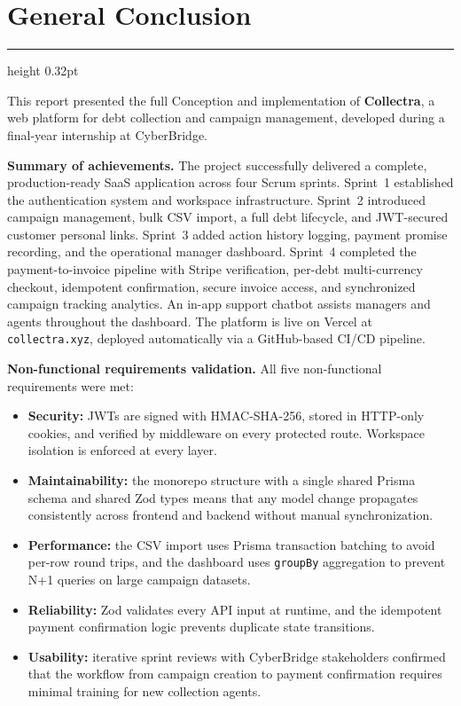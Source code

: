 \documentclass[12pt,a4paper]{report}
\newcommand{\sectionrule}{%
  \vspace{-1pt}%
  {\color{accentblue!22}\hrule height 0.32pt}%
  \vspace{5pt}%
}
\begin{document}
\chapter*{General Conclusion}
{}
\sectionrule

This report presented the full Conception and implementation of \textbf{Collectra}, a
web platform for debt collection and campaign management, developed during a
final-year internship at CyberBridge.

\textbf{Summary of achievements.}
The project successfully delivered a complete, production-ready SaaS application
across four Scrum sprints.
Sprint~1 established the authentication system and workspace infrastructure.
Sprint~2 introduced campaign management, bulk CSV import, a full debt lifecycle,
and JWT-secured customer personal links.
Sprint~3 added action history logging, payment promise recording, and the operational
manager dashboard.
Sprint~4 completed the payment-to-invoice pipeline with Stripe verification,
per-debt multi-currency checkout, idempotent confirmation, secure invoice access, and
synchronized campaign tracking analytics.
An in-app support chatbot assists managers and agents throughout the dashboard.
The platform is live on Vercel at \texttt{collectra.xyz}, deployed automatically via
a GitHub-based CI/CD pipeline.

\textbf{Non-functional requirements validation.}
All five non-functional requirements were met:
\begin{itemize}
  \item \textbf{Security:} JWTs are signed with HMAC-SHA-256, stored in HTTP-only
        cookies, and verified by middleware on every protected route.
        Workspace isolation is enforced at every layer.
  \item \textbf{Maintainability:} the monorepo structure with a single shared Prisma
        schema and shared Zod types means that any model change propagates
        consistently across frontend and backend without manual synchronization.
  \item \textbf{Performance:} the CSV import uses Prisma transaction batching to
        avoid per-row round trips, and the dashboard uses \texttt{groupBy}
        aggregation to prevent N+1 queries on large campaign datasets.
  \item \textbf{Reliability:} Zod validates every API input at runtime, and the
        idempotent payment confirmation logic prevents duplicate state transitions.
  \item \textbf{Usability:} iterative sprint reviews with CyberBridge stakeholders
        confirmed that the workflow from campaign creation to payment confirmation
        requires minimal training for new collection agents.
\end{itemize}
\end{document}
